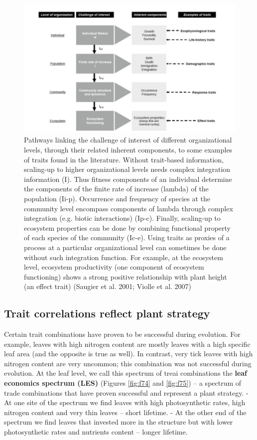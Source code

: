 \documentclass[12pt,oneside]{book}
\begin{document}
\begin{figure}

{\centering \includegraphics[width=0.8\linewidth]{figures/chap7/f73_violle2} 

}

\caption{Pathways linking the challenge of interest of different organizational levels, through their related inherent components, to some examples of traits found in the literature. Without trait-based information, scaling-up to higher organizational levels needs complex integration information (I). Thus fitness components of an individual determine the components of the finite rate of increase (lambda) of the population (Ii-p). Occurrence and frequency of species at the community level encompass components of lambda through complex integration (e.g. biotic interactions) (Ip-c). Finally, scaling-up to ecosystem properties can be done by combining functional property of each species of the community (Ic-e). Using traits as proxies of a process at a particular organizational level can sometimes be done without such integration function. For example, at the ecosystem level, ecosystem productivity (one component of ecosystem functioning) shows a strong positive relationship with plant height (an effect trait) (Saugier et al. 2001; Violle et al. 2007)}\label{fig:f73}
\end{figure}

\subsection{Trait correlations reflect plant
strategy}\label{trait-correlations-reflect-plant-strategy}

Certain trait combinations have proven to be successful during
evolution. For example, leaves with high nitrogen content are mostly
leaves with a high specific leaf area (and the opposite is true as
well). In contrast, very tick leaves with high nitrogen content are very
uncommon; this combination was not successful during evolution. At the
leaf level, we call this spectrum of treai combinations the \textbf{leaf
economics spectrum (LES)} (Figures \ref{fig:f74} and \ref{fig:f75}) -- a
spectrum of trade combinations that have proven successful and represent
a plant strategy. - At one site of the spectrum we find leaves with high
photosynthetic rates, high nitrogen content and very thin leaves --
short lifetime. - At the other end of the spectrum we find leaves that
invested more in the structure but with lower photosynthetic rates and
nutrients content -- longer lifetime.
\end{document}
